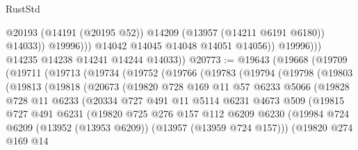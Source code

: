 \begin{lexlean}{RustStd}
\begin{coremodule}
                            @20193
                            (@14191 (@20195 @52))
                            @14209
                            (@13957 (@14211 @6191 @6180))
                            @14033))
                        @19996)))
                  @14042
                  @14045
                  @14048
                  @14051
                  @14056))
              @19996)))
        @14235
        @14238
        @14241
        @14244
        @14033))
@20773 := @19643
    (@19668
      (@19709
        (@19711
          (@19713
            (@19734
              (@19752
                (@19766
                  (@19783
                    (@19794
                      (@19798
                        (@19803
                          (@19813
                            (@19818
                              (@20673
                                (@19820
                                  @728
                                  @169
                                  @11
                                  @57
                                  @6233
                                  @5066
                                  (@19828
                                    @728
                                    @11
                                    @6233
                                    (@20334
                                      @727
                                      @491
                                      @11
                                      @5114
                                      @6231
                                      @4673
                                      @509
                                      (@19815
                                        @727
                                        @491
                                        @6231
                                        (@19820
                                          @725
                                          @276
                                          @157
                                          @112
                                          @6209
                                          @6230
                                          (@19984
                                            @724
                                            @6209
                                            (@13952 (@13953 @6209))
                                            (@13957 (@13959 @724 @157)))
                                          (@19820
                                            @274
                                            @169
                                            @14

\end{coremodule}
\end{lexlean}
